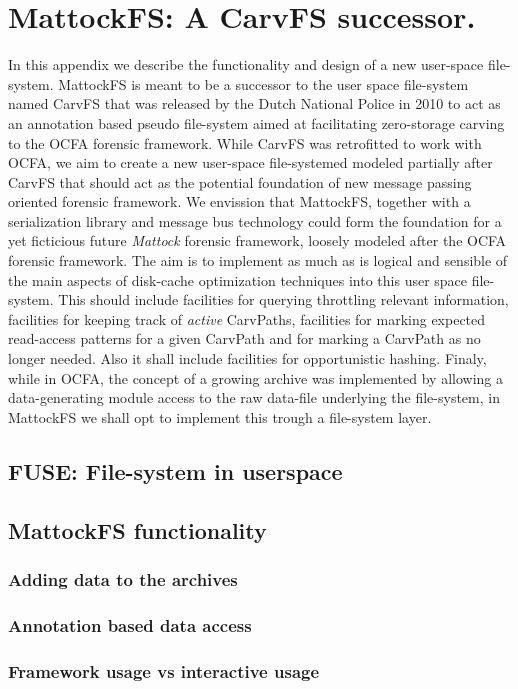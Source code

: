 \chapter{MattockFS: A CarvFS successor.}
In this appendix we describe the functionality and design of a new user-space file-system. MattockFS is meant to be a successor to the user space file-system named CarvFS that was released by the Dutch National Police in 2010 to act as an annotation based pseudo file-system aimed at facilitating zero-storage carving to the OCFA forensic framework. While CarvFS was retrofitted to work with OCFA, we aim to create a new user-space file-systemed modeled partially after CarvFS that should act as the potential foundation of new message passing oriented forensic framework. We envission that MattockFS, together with a serialization library and message bus technology could form the foundation for a yet ficticious future \emph{Mattock} forensic framework, loosely modeled after the OCFA forensic framework. The aim is to implement as much as is logical and sensible of the main aspects of disk-cache optimization techniques into this user space file-system. This should include facilities for querying throttling relevant information, facilities for keeping track of \emph{active} CarvPaths, facilities for marking expected read-access patterns for a given CarvPath and for marking a CarvPath as no longer needed. Also it shall include facilities for opportunistic hashing. Finaly, while in OCFA, the concept of a growing archive was implemented by allowing a data-generating module access to the raw data-file underlying the file-system, in MattockFS we shall opt to implement this trough a file-system layer.
\section{FUSE: File-system in userspace}
\section{MattockFS functionality}
\subsection{Adding data to the archives}
\subsection{Annotation based data access}
\subsection{Framework usage vs interactive usage}
